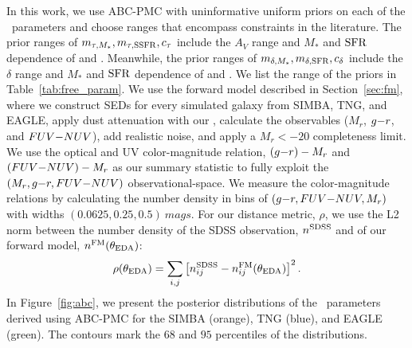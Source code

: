In this work, we use ABC-PMC with uninformative uniform priors on each of
the \eda~parameters and choose ranges that encompass constraints in the
literature.
The prior ranges of $m_{\tau,M_*}, m_{\tau,{\rm SSFR}}, c_\tau$ include the $A_V$ range and $M_*$
and ${\rm SFR}$ dependence of \cite{narayanan2018} and \cite{salim2020}. 
Meanwhile, the prior ranges of $m_{\delta,M_*}, m_{\delta,{\rm SFR}}, c_\delta$ include the
$\delta$ range and $M_*$ and ${\rm SFR}$ dependence of \cite{leja2017} and
\cite{salim2018}. 
We list the range of the priors in Table~\ref{tab:free_param}. 
We use the forward model described in Section~\ref{sec:fm}, where we construct
SEDs for every simulated galaxy from SIMBA, TNG, and EAGLE, apply dust
attenuation with our \eda, calculate the observables ($M_r$, $g{-}r$, and
$FUV{-}NUV$), add realistic noise, and apply a $M_r < -20$ completeness limit. 
We use the optical and UV color-magnitude relation, $(g{-}r)- M_r$ and
$(FUV{-}NUV)-M_r$ as our summary statistic to fully exploit the $(M_r, g{-}r,
FUV{-}NUV)$ observational-space. We measure the color-magnitude relations by
calculating the number density in bins of $(g{-}r, FUV{-}NUV, M_r)$ with widths
$(0.0625, 0.25, 0.5)~mags$. For our distance metric, $\rho$, we use the L2
norm between the number density of the SDSS observation, $n^{\rm SDSS}$ and
of our forward model, $n^{\rm FM}(\theta_{\rm EDA})$: 
\begin{equation} \label{eq:distance}
    \rho(\theta_{\rm \eda}) = \sum\limits_{i,j} \left[n_{ij}^{\rm SDSS} -
    n_{ij}^{\rm FM}(\theta_{\rm \eda}) \right]^2.
\end{equation}
In Figure~\ref{fig:abc}, we present the posterior distributions of the \eda~parameters
derived using ABC-PMC for the SIMBA (orange), TNG (blue), and EAGLE (green).
The contours mark the $68$ and $95$ percentiles of the distributions. 

